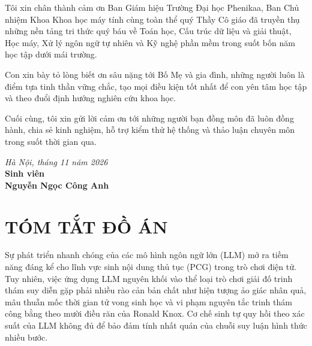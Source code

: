 Tôi xin chân thành cảm ơn Ban Giám hiệu Trường Đại học Phenikaa, Ban Chủ nhiệm Khoa Khoa học máy tính cùng toàn thể quý Thầy Cô giáo đã truyền thụ những nền tảng tri thức quý báu về Toán học, Cấu trúc dữ liệu và giải thuật, Học máy, Xử lý ngôn ngữ tự nhiên và Kỹ nghệ phần mềm trong suốt bốn năm học tập dưới mái trường.

Con xin bày tỏ lòng biết ơn sâu nặng tới Bố Mẹ và gia đình, những người luôn là điểm tựa tinh thần vững chắc, tạo mọi điều kiện tốt nhất để con yên tâm học tập và theo đuổi định hướng nghiên cứu khoa học.

Cuối cùng, tôi xin gửi lời cảm ơn tới những người bạn đồng môn đã luôn đồng hành, chia sẻ kinh nghiệm, hỗ trợ kiểm thử hệ thống và thảo luận chuyên môn trong suốt thời gian qua.

\vspace{1.5cm}
\begin{flushright}
    \textit{Hà Nội, tháng 11 năm 2026}\\[0.2cm]
    \textbf{Sinh viên}\\[1.5cm]
    \textbf{Nguyễn Ngọc Công Anh}
\end{flushright}

\newpage
\chapter*{TÓM TẮT ĐỒ ÁN}

Sự phát triển nhanh chóng của các mô hình ngôn ngữ lớn (LLM) mở ra tiềm năng đáng kể cho lĩnh vực sinh nội dung thủ tục (PCG) trong trò chơi điện tử. Tuy nhiên, việc ứng dụng LLM nguyên khối vào thể loại trò chơi giải đố trinh thám suy diễn gặp phải nhiều rào cản bản chất như hiện tượng ảo giác nhân quả, mâu thuẫn mốc thời gian tử vong sinh học và vi phạm nguyên tắc trinh thám công bằng theo mười điều răn của Ronald Knox. Cơ chế sinh tự quy hồi theo xác suất của LLM không đủ để bảo đảm tính nhất quán của chuỗi suy luận hình thức nhiều bước.


